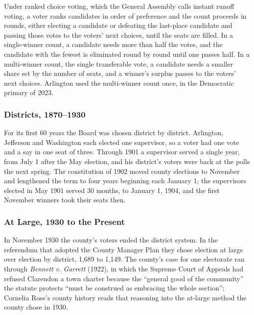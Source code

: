 Under ranked choice voting, which the General Assembly calls instant runoff voting,
a voter ranks candidates in order of preference and the count proceeds in rounds,
either electing a candidate or defeating the last-place candidate and passing those
votes to the voters' next choices, until the seats are
filled.\autocite{vaacts2020c713} In a single-winner count, a candidate needs more
than half the votes, and the candidate with the fewest is eliminated round by round
until one passes half.\autocite{arlingtonboard2026rcv} In a multi-winner count, the
single transferable vote, a candidate needs a smaller share set by the number of
seats, and a winner's surplus passes to the voters' next
choices.\autocite{vaacts2020c713}
Arlington used the multi-winner count once, in the Democratic primary of 2023.

\subsubsection{Districts, 1870--1930}

For its first 60 years the Board was chosen district by district. Arlington,
Jefferson and Washington each elected one supervisor, so a voter had one vote and
a say in one seat of three. Through 1901 a supervisor served a single year, from
July 1 after the May election, and his district's voters were back at the polls the
next spring.\autocite[art.~VII, sec.~2]{vaconstitution1869}\fnsep\autocite[ch.~76,
secs.~4 and 14]{vaacts1870} The constitution of 1902 moved county elections to
November and lengthened the term to four years beginning each January 1; the
supervisors elected in May 1901 served 30 months, to January 1, 1904, and the first
November winners took their seats
then.\autocite[sec.~112; Schedule, sec.~10]{vaconstitution1902}

\subsubsection{At Large, 1930 to the Present}

In November 1930 the county's voters ended the district system. In the referendum
that adopted the County Manager Plan they chose election at large over election by
district, 1,689 to 1,149.\autocite[194--196]{rose1976}
The county's case for one electorate ran through \textit{Bennett v. Garrett}
(1922), in which the Supreme Court of Appeals had refused Clarendon a town charter
because the ``general good of the community'' the statute protects ``must be
construed as embracing the whole section'';\autocite{bennettvgarrett1922} Cornelia
Rose's county history reads that reasoning into the at-large method the county
chose in 1930.\autocite[176, 197]{rose1976}


